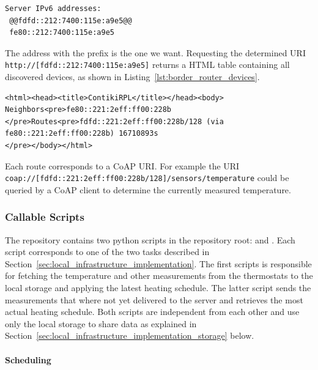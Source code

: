 \begin{lstlisting}[numbers=none, moredelim={[is][keywordstyle]{@@}{@@}}]
Server IPv6 addresses:
 @@fdfd::212:7400:115e:a9e5@@
 fe80::212:7400:115e:a9e5
\end{lstlisting}

The address with the prefix  is the one we want. Requesting the determined URI \nolinkurl{http://[fdfd::212:7400:115e:a9e5]} returns a HTML table containing all discovered devices, as shown in Listing~\ref{lst:border_router_devices}.

\begin{lstlisting}[label={lst:border_router_devices}, caption={Example of routing table provided by the border routers web service}]
<html><head><title>ContikiRPL</title></head><body>
Neighbors<pre>fe80::221:2eff:ff00:228b
</pre>Routes<pre>fdfd::221:2eff:ff00:228b/128 (via fe80::221:2eff:ff00:228b) 16710893s
</pre></body></html>
\end{lstlisting}

Each route corresponds to a CoAP URI. For example the URI \nolinkurl{coap://[fdfd::221:2eff:ff00:228b/128]/sensors/temperature} could be queried by a CoAP client to determine the currently measured temperature.


\subsubsection{Callable Scripts}
\label{sec:local_infrastructure_implementation_scripts}

The  repository contains two python scripts in the repository root:  and .
Each script corresponds to one of the two tasks described in Section~\ref{sec:local_infrastructure_implementation}.
The first scripts is responsible for fetching the temperature and other measurements from the thermostats to the local storage and applying the latest heating schedule.
The latter script sends the measurements that where not yet delivered to the server and retrieves the most actual heating schedule. Both scripts are independent from each other and use only the local storage to share data as explained in Section~\ref{sec:local_infrastructure_implementation_storage} below.

\paragraph{Scheduling}

